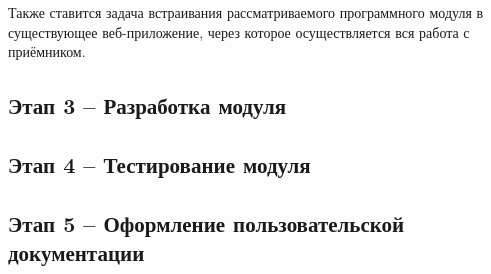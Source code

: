 \documentclass[ltitles]{../../scs-iam}
\begin{document}
  Также ставится задача встраивания рассматриваемого программного модуля в существующее веб-приложение, через которое осуществляется вся работа с приёмником.
  
  \subsection{Этап 3 -- Разработка модуля}
  
  \subsection{Этап 4 -- Тестирование модуля}
  
  \subsection{Этап 5 -- Оформление пользовательской документации}
\end{document}
